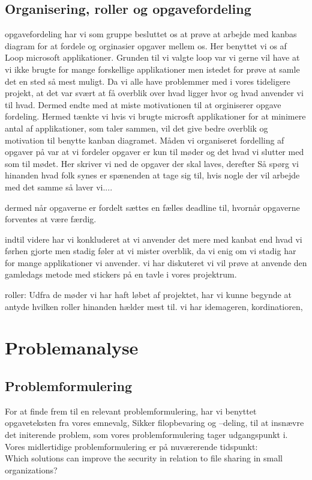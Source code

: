 \documentclass[12pt,a4paper]{article}
\begin{document}
\subsection{Organisering, roller og opgavefordeling}
opgavefordeling har vi som gruppe besluttet os at prøve at arbejde med kanbas diagram for at fordele og orginasier opgaver mellem os. Her benyttet vi os af Loop microsoft applikationer. Grunden til vi valgte loop var vi gerne vil have at vi ikke brugte for mange forskellige applikationer men istedet for prøve at samle det en sted så mest muligt. Da vi alle have problemmer med i vores tideligere projekt, at det var svært at få overblik over hvad ligger hvor og hvad anvender vi til hvad. Dermed endte med at miste motivationen til at orginiserer opgave fordeling. Hermed tænkte vi hvis vi brugte microsft applikationer for at minimere antal af applikationer, som taler sammen, vil det give bedre overblik og motivation til benytte kanban diagramet. Måden vi organiseret fordelling af opgaver på var at vi fordeler opgaver er kun til møder og det hvad vi slutter med som til mødet. Her skriver vi ned de opgaver der skal laves, derefter Så spørg vi hinanden hvad folk synes er spænenden at tage sig til, hvis nogle der vil arbejde med det samme så laver vi....

dermed når opgaverne er fordelt sættes en fælles deadline til, hvornår opgaverne forventes at være færdig.  

indtil videre har vi konkluderet at vi anvender det mere med kanbat end hvad vi førhen gjorte men stadig føler at vi mister overblik, da vi enig om vi stadig har for mange applikationer vi anvender. vi har diskuteret vi vil prøve at anvende den gamledags metode med stickers på en tavle i vores projektrum. 

roller:
Udfra de møder vi har haft løbet af projektet, har vi kunne begynde at antyde hvilken roller hinanden hælder mest til. 
vi har idemageren, kordinatioren, 
\clearpage

\section{Problemanalyse}
\subsection{Problemformulering}
For at finde frem til en relevant problemformulering, har vi benyttet opgaveteksten fra vores emnevalg, Sikker filopbevaring og –deling, til at insnævre det initerende problem, som vores problemformulering tager udgangspunkt i. Vores midlertidige problemformulering er på nuværerende tidspunkt: \\
Which solutions can improve the security in relation to file sharing in small organizations?\\
\end{document}
